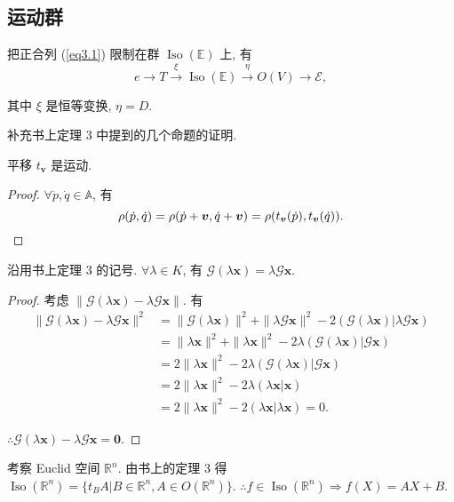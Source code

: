 \documentclass[color=black,device=normal,lang=cn,mode=geye]{elegantnote}
\begin{document}
\subsection{运动群}
把正合列 (\ref{eq3.1}) 限制在群 $\operatorname{Iso}(\mathbb{E})$ 上, 有
\[e\to T\xrightarrow{\xi}\operatorname{Iso}(\mathbb{E})\xrightarrow{\eta}O(V)\to\mathcal{E},\]

其中 $\xi$ 是恒等变换, $\eta=D$.

补充书上定理 3 中提到的几个命题的证明.
\begin{theorem}
    平移 $t_{\boldsymbol{v}}$ 是运动.
\end{theorem}
\begin{proof}
    $\forall\dot{p},\dot{q}\in\mathbb{A}$, 有
    \[\rho(\dot{p},\dot{q})=\rho(\dot{p}+\boldsymbol{v},\dot{q}+\boldsymbol{v})=\rho(t_{\boldsymbol{v}}(\dot{p}),t_{\boldsymbol{v}}(\dot{q})).\qedhere\]
\end{proof}
\begin{theorem}
    沿用书上定理 3 的记号. $\forall\lambda\in K$, 有 $\mathcal{G}(\lambda\boldsymbol{x})=\lambda\mathcal{G}\boldsymbol{x}$.
\end{theorem}
\begin{proof}
    考虑 $\|\mathcal{G}(\lambda\boldsymbol{x})-\lambda\mathcal{G}\boldsymbol{x}\|$. 有
    \begin{align*}
        \|\mathcal{G}(\lambda\boldsymbol{x})-\lambda\mathcal{G}\boldsymbol{x}\|^2 & =\|\mathcal{G}(\lambda\boldsymbol{x})\|^2+\|\lambda\mathcal{G}\boldsymbol{x}\|^2-2(\mathcal{G}(\lambda\boldsymbol{x})|\lambda\mathcal{G}\boldsymbol{x}) \\
        & =\|\lambda\boldsymbol{x}\|^2+\|\lambda\boldsymbol{x}\|^2-2\lambda(\mathcal{G}(\lambda\boldsymbol{x})|\mathcal{G}\boldsymbol{x}) \\
        & =2\|\lambda\boldsymbol{x}\|^2-2\lambda(\mathcal{G}(\lambda\boldsymbol{x})|\mathcal{G}\boldsymbol{x}) \\
        & =2\|\lambda\boldsymbol{x}\|^2-2\lambda(\lambda\boldsymbol{x}|\boldsymbol{x}) \\
        & =2\|\lambda\boldsymbol{x}\|^2-2(\lambda\boldsymbol{x}|\lambda\boldsymbol{x})=0.
    \end{align*}

    $\therefore\mathcal{G}(\lambda\boldsymbol{x})-\lambda\mathcal{G}\boldsymbol{x}=\boldsymbol{0}$.
\end{proof}
考察 Euclid 空间 $\mathbb{R}^n$. 由书上的定理 3 得 $\operatorname{Iso}(\mathbb{R}^n)=\{t_{B}A|B\in\mathbb{R}^n,A\in O(\mathbb{R}^n)\}$. $\therefore f\in\operatorname{Iso}(\mathbb{R}^n)\Rightarrow f(X)=AX+B$.
\end{document}
